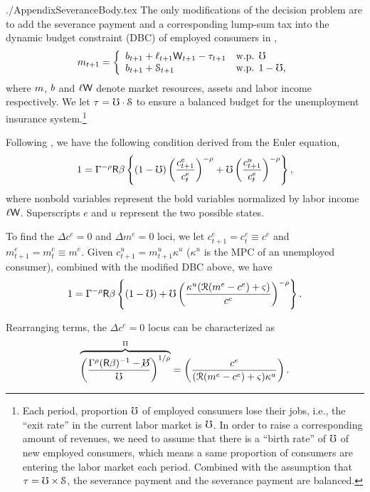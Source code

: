 \documentclass{econtex}
\begin{document}
\begin{verbatimwrite}{./AppendixSeveranceBody.tex}
The only modifications of the decision problem are to add
the severance payment and a corresponding lump-sum tax into the
dynamic budget constraint (DBC) of employed consumers in
\cite{ctDiscrete},
\begin{displaymath}
    m_{t+1}=\left\{
    \begin{array}{ll}
    b_{t+1}+\ell_{t+1}\mathsf{W}_{t+1}-\tau_{t+1} & \mbox{w.p. } \mho\\
    b_{t+1}+\mathcal{S}_{t+1} & \mbox{w.p. }1-\mho,
    \end{array}
    \right.
\end{displaymath}
where $m$, $b$ and $\ell\mathsf{W}$ denote market resources,
assets and labor income respectively. We let $\tau=\mho\cdot
\mathcal{S}$ to ensure a balanced budget for the unemployment 
insurance system.\footnote{Each period, proportion
  $\mho$ of employed consumers lose their jobs, i.e., the ``exit
  rate'' in the current labor market is $\mho$.  In order to raise a
  corresponding amount of revenues, we need to assume that there is a
  ``birth rate'' of $\mho$ of new employed consumers, which means a
  same proportion of consumers are entering the labor market each
  period. Combined with the assumption that $\tau=\mho\times
  \mathcal{S}$, the severance payment and the severance payment are
  balanced.} 

Following \cite{ctDiscrete}, we have the following condition derived from the Euler equation,
\begin{equation}
  1  = \Gamma^{-\rho}\mathsf{R}\beta \left\{(1-\mho)\left(\frac{c^{e}_{t+1}}{c^{e}_{t}}\right)^{-\rho}+\mho \left(\frac{c^{u}_{t+1}}{c^{e}_{t}}\right)^{-\rho}\right\},
\end{equation}
where nonbold variables represent the bold variables normalized by
labor income $\ell\mathsf{W}$. Superscripts $e$ and $u$ represent the two
possible states.

To find the $\Delta c^e=0$ and $\Delta m^e=0$ loci, we let
$c_{t+1}^e=c_t^e\equiv c^e$ and $m_{t+1}^e=m_{t}^e\equiv m^e$. Given
$c_{t+1}^u=m_{t+1}^u\kappa^u$ ($\kappa^u$ is the MPC of an unemployed
consumer), combined with the modified DBC above, we have
\begin{equation*}
1 = \Gamma^{-\rho}\mathsf{R}\beta \left\{(1-\mho)+\mho \left(\frac{\kappa^{u}(\mathcal{R}(m^e-c^e)+\varsigma)}{c^{e}}\right)^{-\rho}\right\}.
\end{equation*}

Rearranging terms, the $\Delta c^e=0$ locus can be characterized as
\begin{equation}
\overbrace{\left(\frac{\Gamma^{\rho}(\mathsf{R}\beta)^{-1}-\cancel{\mho}}{\mho}\right)^{1/\rho}}^{\Pi}=\left(\frac{c^e}{(\mathcal{R}(m^e-c^e)+\varsigma)\kappa^{u}}\right).
\end{equation}


\end{verbatimwrite}
\end{document}

